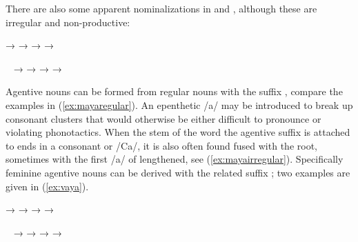 There are also some apparent nominalizations in  and 
, although these are irregular and non-productive:

\pex
	\a {}
		→ 
	\a {}
		→ 
	\a {}
		→ 
	\a {}
		→ 
\xe

\pex~
	\a {}
		→ 
	\a {}
		→ 
	\a {}
		→ 
	\a {}
		→ 
\xe

Agentive nouns can be formed from regular nouns with the suffix 
, compare the examples in (\ref{ex:mayaregular}). An 
epenthetic /a/ may be introduced to break up consonant clusters that would 
otherwise be either difficult to pronounce or violating phonotactics. When the 
stem of the word the agentive suffix is attached to ends in a consonant or 
/Ca/, it is also often found fused with the root, sometimes with the first /a/ 
of  lengthened, see (\ref{ex:mayairregular}). Specifically feminine 
agentive nouns can be derived with the related suffix ; two 
examples are given in (\ref{ex:vaya}).

\pex\label{ex:mayaregular}
	\a {}
		→ 
	\a {}
		→ 
	\a {}
		→ 
	\a {}
		→ 
\xe

\pex~\label{ex:mayairregular}
	\a {}
		→ 
	\a {}
		→ 
	\a {}
		→ 
	\a {}
		→ 
\xe

